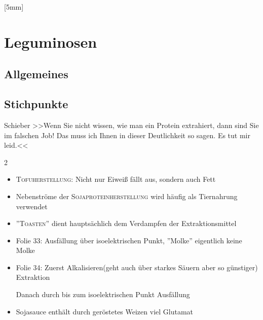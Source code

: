 \documentclass[a4paper,10pt]{article}
\begin{document}

\reversemarginpar
\marginnote{\color{miugray2}\textbf{\today}}[5mm]







\section{Leguminosen}
\subsection{Allgemeines}
\lipsum[1]


\subsection{Stichpunkte}
\begin{zitat}{Schieber}{} \small >>Wenn Sie nicht wissen, wie man ein Protein extrahiert, dann sind Sie im falschen Job! Das muss ich Ihnen in dieser Deutlichkeit so sagen. Es tut mir leid.<<
\end{zitat}

\begin{multicols}{2}
\begin{itemize}
\item \textsc{{\color{petunitext!55!red}Tofuherstellung}}: Nicht nur Eiweiß fällt aus, sondern auch Fett
\item Nebenströme der \textsc{Sojaproteinherstellung} wird häufig als Tiernahrung verwendet
\item ''\textsc{Toasten}'' dient hauptsächlich dem Verdampfen der Extraktionsmittel
\item \colorbox{miugray2!25}{Folie 33:} Ausfällung über isoelektrischen Punkt, ''Molke'' eigentlich keine Molke
\item \colorbox{miugray2!25}{Folie 34:} Zuerst Alkalisieren(geht auch über starkes Säuern aber so günstiger) \RA Extraktion \par
Danach durch  bis zum isoelektrischen Punkt \RA Ausfällung
\item Sojasauce enthält durch geröstetes Weizen viel Glutamat
\end{itemize}
\end{multicols}
\end{document}
